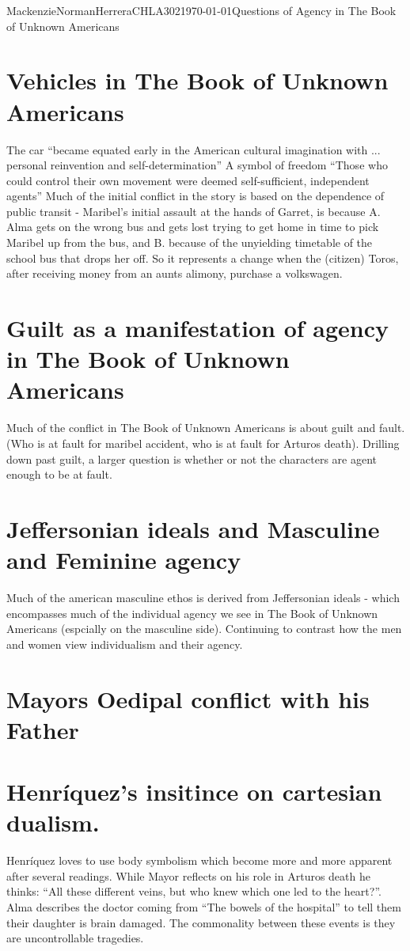 \documentclass{article}
\begin{document}
\begin{mla}{Mackenzie}{Norman}{Herrera}{CHLA302}{\today}{Questions of Agency in The Book of Unknown Americans}
\section*{Vehicles in The Book of Unknown Americans}
The car ``became equated early in the American cultural imagination with ... personal reinvention and self-determination'' \cite{Uhlman2015-qx} A symbol of freedom ``Those who could control their own movement were deemed self-sufficient, independent agents'' \cite{Uhlman2015-qx} Much of the initial conflict in the story is based on the dependence of public transit - Maribel's initial assault at the hands of Garret, is because A. Alma gets on the wrong bus and gets lost trying to get home in time to pick Maribel up from the bus, and B. because of the unyielding timetable of the school bus that drops her off. So it represents a change when the (citizen) Toros, after receiving money from an aunts alimony, purchase a volkswagen.

\section*{Guilt as a manifestation of agency in The Book of Unknown Americans}
Much of the conflict in The Book of Unknown Americans is about guilt and fault. (Who is at fault for maribel accident, who is at fault for Arturos death). Drilling down past guilt, a larger question is whether or not the characters are agent enough to be at fault. 
\section*{Jeffersonian ideals and Masculine and Feminine agency}
Much of the american masculine ethos is derived from Jeffersonian ideals - which encompasses much of the individual agency we see in The Book of Unknown Americans (espcially on the masculine side).  Continuing to contrast how the men and women view individualism and their agency.
\section*{Mayors Oedipal conflict with his Father}

\section*{Henríquez's insitince on cartesian dualism.}
Henríquez loves to use body symbolism which become more and more apparent after several readings. While Mayor reflects on his role in Arturos death he thinks: ``All these different veins, but who knew which one led to the heart?''. Alma describes the doctor coming from ``The bowels of the hospital'' to tell them their daughter is brain damaged. The commonality between these events is they are uncontrollable tragedies. 


\end{mla}
\end{document}

